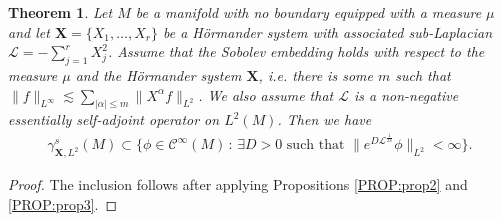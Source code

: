 \documentclass[12pt,oneside,a4paper]{book}
\numberwithin{equation}{section}     %
\theoremstyle{plain}
\newtheorem{theorem}{Theorem}[section]
\theoremstyle{definition}
\newcommand{\slp}{{\mathcal L}}
\begin{document}
\begin{theorem}\label{THM:implication}
	Let $M$ be a manifold with no boundary equipped with a measure $\mu$ and let $\mathbf{X} =\{X_1,\dots,X_r\}$ be a H\"ormander system with associated sub-Laplacian $\slp=-\sum_{j=1}^rX_j^2$. Assume that the \textit{Sobolev embedding} holds with respect to the measure $\mu$ and the H\"ormander system $\mathbf{X}$, i.e. there is some $m$ such that $\|f\|_{L^\infty}\lesssim\sum_{|\alpha|\leq m}\|X^\alpha f\|_{L^2}$. We also assume that $\slp$ is a non-negative essentially self-adjoint operator on $L^2(M)$. Then we have
	\begin{align*}
	\gamma^s_{\mathbf{X},L^2}(M)\subset\big\{\phi\in\mathcal C^\infty(M)\,:\,\exists D>0\text{ such that }\|e^{D\slp^{\frac{1}{2s}}}\phi\|_{L^2}<\infty\big\}.
	\end{align*}
\end{theorem}

\begin{proof}
	The inclusion follows after applying Propositions \ref{PROP:prop2} and \ref{PROP:prop3}.
\end{proof}
\end{document}
